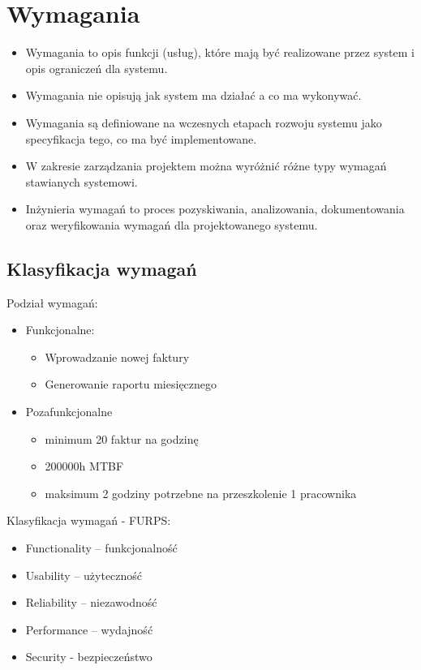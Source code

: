 \documentclass[a4paper]{article}
\begin{document}
\section{Wymagania}
\begin{itemize}
    \item Wymagania to opis funkcji (usług), które mają być
    realizowane przez system i opis ograniczeń dla systemu.
    \item Wymagania nie opisują jak system ma działać a co ma
    wykonywać.
    \item Wymagania są definiowane na wczesnych etapach
    rozwoju systemu jako specyfikacja tego, co ma być
    implementowane.
    \item W zakresie zarządzania projektem można wyróżnić
    różne typy wymagań stawianych systemowi.
    \item Inżynieria wymagań to proces pozyskiwania,
    analizowania, dokumentowania oraz weryfikowania
    wymagań dla projektowanego systemu.

\end{itemize}

\subsection{Klasyfikacja wymagań}
    Podział wymagań:
    \begin{itemize}
        \item Funkcjonalne:
        \begin{itemize}
            \item Wprowadzanie nowej faktury
            \item Generowanie raportu miesięcznego
        \end{itemize}
        \item Pozafunkcjonalne
        \begin{itemize}
            \item minimum 20 faktur na godzinę
            \item 200000h MTBF
            \item maksimum 2 godziny potrzebne na przeszkolenie
        1 pracownika
        \end{itemize}
    \end{itemize}

    Klasyfikacja wymagań - FURPS:
    \begin{itemize}
        \item Functionality – funkcjonalność
        \item Usability – użyteczność
        \item Reliability – niezawodność
        \item Performance – wydajność
        \item Security - bezpieczeństwo
    \end{itemize}
\end{document}
